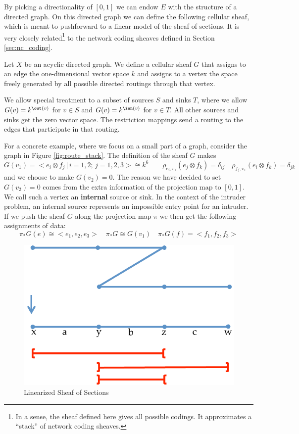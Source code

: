 By picking a directionality of $[0,1]$ we can endow $E$ with the structure of a directed graph. On this directed graph we can define the following cellular sheaf, which is meant to pushforward to a linear model of the sheaf of sections. It is very closely related\footnote{In a sense, the sheaf defined here gives all possible codings. It approximates a ``stack'' of network coding sheaves.} to the network coding sheaves defined in Section \ref{sec:nc_coding}.

\begin{defn}
	Let $X$ be an acyclic directed graph. We define a cellular sheaf $G$ that assigns to an edge the one-dimensional vector space $k$ and assigns to a vertex the space freely generated by all possible directed routings through that vertex. 
	
	We allow special treatment to a subset of sources $S$ and sinks $T$, where we allow $G(v)=k^{\out(v)}$ for $v\in S$ and $G(v)=k^{\inn(v)}$ for $v\in T$. All other sources and sinks get the zero vector space. The restriction mappings send a routing to the edges that participate in that routing.	
\end{defn}

\begin{ex}
For a concrete example, where we focus on a small part of a graph, consider the graph in Figure \ref{fig:route_stack}. The definition of the sheaf $G$ makes
\[
	G(v_1)=<e_i\otimes f_j \, | \, i=1,2; \,j=1,2,3>\cong k^6 \qquad \rho_{e_i,v_1}(e_j\otimes f_k)=\delta_{ij} \quad \rho_{f_j,v_1}(e_i\otimes f_k)=\delta_{jk} 
\]
and we choose to make $G(v_2)=0$. The reason we have decided to set $G(v_2)=0$ comes from the extra information of the projection map to $[0,1]$. We call such a vertex an \textbf{internal} source or sink. In the context of the intruder problem, an internal source represents an impossible entry point for an intruder. If we push the sheaf $G$ along the projection map $\pi$ we then get the following assignments of data:
\[
	\pi_*G(e)\cong<e_1,e_2,e_3> \quad \pi_*G\cong G(v_1) \quad \pi_*G(f)=<f_1,f_2,f_3>
\]
\end{ex}

\begin{figure}
\begin{center}
\includegraphics[width=.7\textwidth]{evade_sec_bc_new.pdf}
\caption{Linearized Sheaf of Sections}
\label{fig:evade_sec_bc}
\end{center}
\end{figure}

